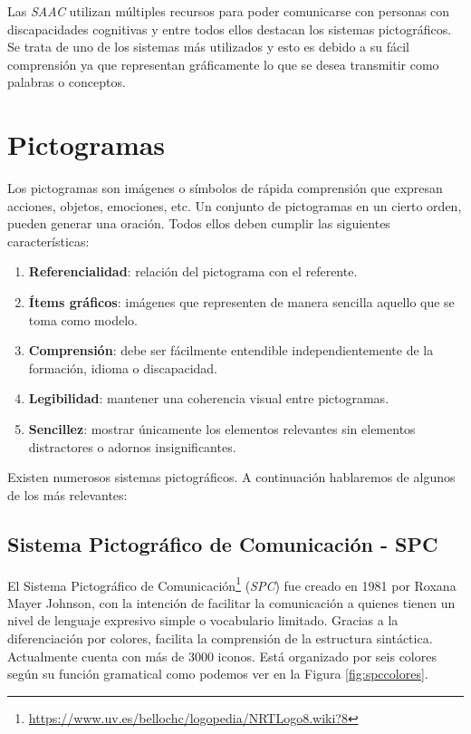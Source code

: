 Las \textit{SAAC} utilizan múltiples recursos para poder comunicarse con personas con discapacidades cognitivas y entre todos ellos destacan los sistemas pictográficos. Se trata de uno de los sistemas más utilizados y esto es debido a su fácil comprensión ya que representan gráficamente lo que se desea transmitir como palabras o conceptos. 

\section{Pictogramas}
Los pictogramas son imágenes o símbolos de rápida comprensión que expresan acciones, objetos, emociones, etc. Un conjunto de pictogramas en un cierto orden, pueden generar una oración. Todos ellos deben cumplir las siguientes características:
\begin{enumerate}
	\item \textbf{Referencialidad}: relación del pictograma con el referente.
	\item \textbf{Ítems gráficos}: imágenes que representen de manera sencilla aquello que se toma como modelo.
	\item \textbf{Comprensión}: debe ser fácilmente entendible independientemente de la formación, idioma o discapacidad.
	\item \textbf{Legibilidad}: mantener una coherencia visual entre pictogramas.
	\item \textbf{Sencillez}: mostrar únicamente los elementos relevantes sin elementos distractores o adornos insignificantes.
\end{enumerate}


 
Existen numerosos sistemas pictográficos. A continuación hablaremos de algunos de los más relevantes:

\subsection{Sistema Pictográfico de Comunicación - SPC}

El Sistema Pictográfico de Comunicación\footnote{\url{https://www.uv.es/bellochc/logopedia/NRTLogo8.wiki?8}} (\textit{SPC}) fue creado en 1981 por Roxana Mayer Johnson, con la intención de facilitar la comunicación a quienes tienen un nivel de lenguaje expresivo simple o vocabulario limitado. Gracias a la diferenciación por colores, facilita la comprensión de la estructura sintáctica. Actualmente cuenta con más de 3000 iconos. Está organizado por seis colores según su función gramatical como podemos ver en la Figura \ref{fig:spccolores}.

